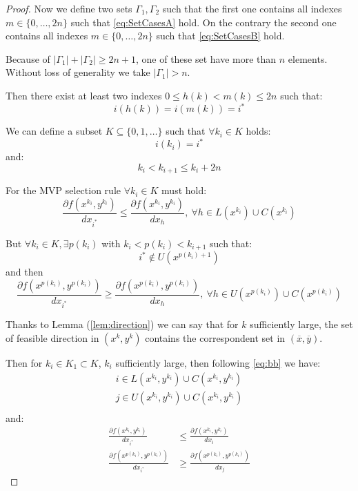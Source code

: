 \begin{proof}
Now we define two sets $\Gamma_1,\Gamma_2$ such that the first one contains all indexes $m \in\{0,\ldots,2n\}$ such that \ref{eq:SetCasesA} hold.
On the contrary the second one contains all indexes $m \in\{0,\ldots,2n\}$ such that \ref{eq:SetCasesB} hold.

Because of $|\Gamma_1|+|\Gamma_2|\ge2n+1$, one of these set have more than $n$ elements. Without loss of generality we take $|\Gamma_1|> n$.

Then there exist at least two indexes $0\le h(k)< m(k)\le 2n$ such that:
\begin{equation}
 i(h(k))=i(m(k))=i^*
\end{equation}

We can define a subset $K \subseteq \{0,1,\ldots\}$ such that $\forall k_i \in K$ holds:
\begin{equation}
 i(k_i)=i^*
\end{equation}
and:
\begin{equation}
 k_i <k_{i+1} \le k_i+2n
\end{equation}

For the MVP selection rule $\forall k_i \in K$ must hold:
\begin{equation}
 \frac{\partial f(x^{k_i},y^{k_i})}{dx_{i^*}} \le \frac{\partial f(x^{k_i},y^{k_i})}{dx_{h}}, \ \forall h \in L(x^{k_i}) \cup C(x^{k_i})
\end{equation}

But  $\forall k_i \in K,\exists p(k_i)$ with  $k_i <p(k_i)<k_{i+1}$ such that:
\begin{equation}
 i^* \not \in U(x^{p(k_i)+1})
\end{equation}
and then
\begin{equation}
 \frac{\partial f(x^{p(k_i)},y^{p(k_i)})}{dx_{i^*}} \ge \frac{\partial f(x^{p(k_i)},y^{p(k_i)})}{dx_{h}}, \ \forall h \in U(x^{p(k_i)}) \cup C(x^{p(k_i)})
\end{equation}


Thanks to Lemma (\ref{lem:direction}) we can say that for $k$ sufficiently large, the set of feasible direction in $(x^k,y^k)$ contains the correspondent set in $(\overline{x},\overline{y})$.

Then for $k_i \in K_1 \subset K$, $k_i$ sufficiently large, then following \ref{eq:bb} we have:
\begin{equation}
\begin{aligned}
i \in L(x^{k_i},y^{k_i}) \cup C(x^{k_i},y^{k_i})\\
j \in U(x^{k_i},y^{k_i}) \cup C(x^{k_i},y^{k_i})\\
\end{aligned}
\end{equation}
and:
\begin{equation}\label{eq:direction1}
\begin{aligned}
 \frac{\partial f(x^{k_i},y^{k_i})}{dx_{i^*}} &\le \frac{\partial f(x^{k_i},y^{k_i})}{dx_{i}}\\
 \frac{\partial f(x^{p(k_i)},y^{p(k_i)})}{dx_{i^*}} &\ge \frac{\partial f(x^{p(k_i)},y^{p(k_i)})}{dx_{j}}
 \end{aligned}
\end{equation}


\end{proof}
